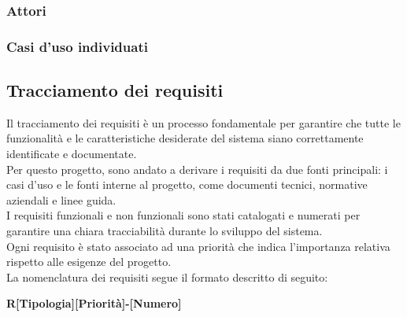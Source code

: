 \subsubsection{Attori}
\label{subsubsec:attori}



\pagebreak
\subsubsection{Casi d'uso individuati}
\label{subsubsec:casi-uso-individuati}



\pagebreak
\subsection{Tracciamento dei requisiti}
\label{subsec:requisiti}

Il tracciamento dei requisiti è un processo fondamentale per garantire che tutte le funzionalità e le caratteristiche desiderate del sistema siano correttamente identificate e documentate. \\
Per questo progetto, sono andato a derivare i requisiti da due fonti principali: i casi d'uso e le fonti interne al progetto, come documenti tecnici, normative aziendali e linee guida.\\ 

\noindent I requisiti funzionali e non funzionali sono stati catalogati e numerati per garantire una chiara tracciabilità durante lo sviluppo del sistema.\\
Ogni requisito è stato associato ad una priorità che indica l'importanza relativa rispetto alle esigenze del progetto.\\

\noindent La nomenclatura dei requisiti segue il formato descritto di seguito:

\begin{center}
\textbf{R[Tipologia][Priorità]-[Numero]}
\end{center}

